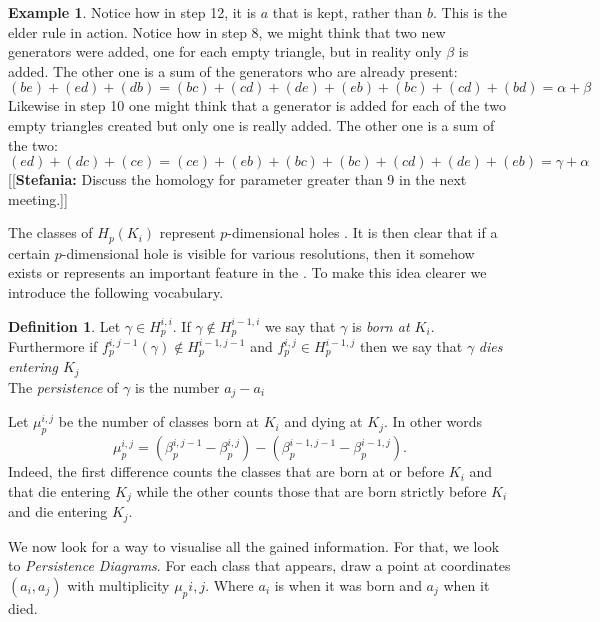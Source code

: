 \documentclass{article}
\newcommand{\ste}[1]{{\color{green}[[\textbf{Stefania: }#1]]}}
\theoremstyle{plain}
\theoremstyle{definition}
\newtheorem{definition}[thm]{Definition}
\newtheorem{example}[thm]{Example}
\theoremstyle{remark}
\begin{document}
\begin{example}
Notice how in step 12, it is $a$ that is kept, rather than $b$. This is the elder rule in action.
Notice how in step 8, we might think that two new generators were added, one for each empty triangle, but in reality only $\beta$ is added. The other one is a sum of the generators who are already present:
\[(be)+(ed)+(db)=(bc)+(cd)+(de)+(eb)+(bc)+(cd)+(bd)= \alpha + \beta  \]
Likewise in step 10 one might think that a generator is added for each of the two empty triangles created but only one is really added. The other one is a sum of the two:
\[ (ed)+(dc)+(ce) = (ce)+(eb)+(bc)+(bc)+(cd)+(de)+(eb) = \gamma + \alpha \]
\ste{Discuss the homology for parameter greater than 9 in the next meeting.}
\end{example}

The classes of $H_p(K_i)$ represent $p$-dimensional holes . It is then clear that if a certain $p$-dimensional hole is visible for various resolutions, then it somehow exists or represents an important feature in the . To make this idea clearer we introduce the following vocabulary.

\begin{definition}
Let $\gamma \in H_p^{i,i} $. If $\gamma \notin H_p^{i-1,i}$ we say that $\gamma$ is \emph{born at $K_i$}. \\
Furthermore if $f_p^{i,j-1}(\gamma) \notin H_p^{i-1,j-1}$ and $f_p^{i,j} \in H_p^{i-1,j}$ then we say that $\gamma$ \emph{dies entering $K_j$} \\
The \emph{persistence} of $\gamma$ is the number $a_j-a_i$
\end{definition}

Let $\mu_p^{i,j}$ be the number of classes born at $K_i$ and dying at $K_j$. In other words 
\[ \mu_p^{i,j} = \left( \beta_p^{i,j-1} - \beta_p^{i,j} \right) - \left( \beta_p^{i-1,j-1} - \beta_p^{i-1,j}  \right). \]
Indeed, the first difference counts the classes that are born at or before $K_i$ and that die entering $K_j$ while the other counts those that are born strictly before $K_i$ and die entering $K_j$.

We now look for a way to visualise all the gained information. For that, we look to \emph{Persistence Diagrams}. For each class that appears, draw a point at coordinates $(a_i,a_j)$ with multiplicity $\mu_p{i,j}$. Where $a_i$ is when it was born and $a_j$ when it died.
\end{document}
